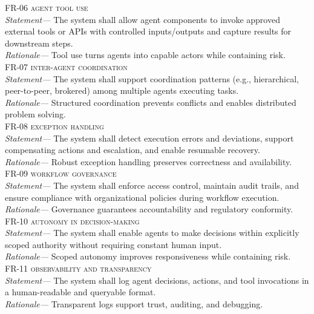 \noindent \textsc{FR-06 agent tool use} \\
\indent \emph{Statement—} The system shall allow agent components to invoke approved external tools or APIs with controlled inputs/outputs and capture results for downstream steps. \\
\indent \emph{Rationale—} Tool use turns agents into capable actors while containing risk. \\

\noindent \textsc{FR-07 inter-agent coordination} \\
\indent \emph{Statement—} The system shall support coordination patterns (e.g., hierarchical, peer-to-peer, brokered) among multiple agents executing tasks. \\
\indent \emph{Rationale—} Structured coordination prevents conflicts and enables distributed problem solving. \\

\noindent \textsc{FR-08 exception handling} \\
\indent \emph{Statement—} The system shall detect execution errors and deviations, support compensating actions and escalation, and enable resumable recovery. \\
\indent \emph{Rationale—} Robust exception handling preserves correctness and availability. \\

\noindent \textsc{FR-09 workflow governance} \\
\indent \emph{Statement—} The system shall enforce access control, maintain audit trails, and ensure compliance with organizational policies during workflow execution. \\
\indent \emph{Rationale—} Governance guarantees accountability and regulatory conformity. \\

\noindent \textsc{FR-10 autonomy in decision-making} \\
\indent \emph{Statement—} The system shall enable agents to make decisions within explicitly scoped authority without requiring constant human input. \\
\indent \emph{Rationale—} Scoped autonomy improves responsiveness while containing risk. \\

\noindent \textsc{FR-11 observability and transparency} \\
\indent \emph{Statement—} The system shall log agent decisions, actions, and tool invocations in a human-readable and queryable format. \\
\indent \emph{Rationale—} Transparent logs support trust, auditing, and debugging. \\

